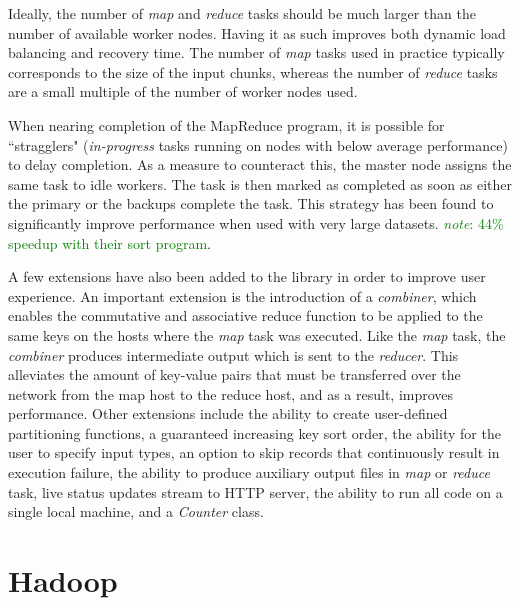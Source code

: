 \documentclass{report}
\newcommand{\note}[1]{\textcolor{green}{\textit{note}: #1}}
\begin{document}
Ideally, the number of \textit{map} and \textit{reduce} tasks should be much larger than the number of available worker nodes. Having it as 
such improves both dynamic load balancing and recovery time. The number of \textit{map} tasks used in practice typically corresponds to the 
size of the input chunks, whereas the number of \textit{reduce} tasks are a small multiple of the number of worker nodes used.

When nearing completion of the MapReduce program, it is possible for  ``stragglers" (\textit{in-progress} tasks running on nodes with below 
average performance) to delay completion. As a measure to counteract this, the master node assigns the same task to idle workers. The 
task is then marked as completed as soon as either the primary or the backups complete the task. This strategy has been found to 
significantly improve performance when used with very large datasets. \note{44\% speedup with their sort program}.

A few extensions have also been added to the library in order to improve user experience. An important extension is the introduction of a 
\textit{combiner}, which enables the commutative and associative reduce function to be applied to the same keys on the hosts where the 
\textit{map} task was executed. Like the \textit{map} task, the \textit{combiner} produces intermediate output which is sent to the 
\textit{reducer}. This alleviates the amount of key-value pairs that must be transferred over the network from the map host to the reduce host, 
and as a result, improves performance. Other extensions include the ability to create user-defined partitioning functions, a guaranteed 
increasing key sort order, the ability for the user to specify input types, an option to skip records that continuously result in execution failure, 
the ability to produce auxiliary output files in \textit{map} or \textit{reduce} task, live status updates stream to HTTP server,  the ability to run 
all code on a single local machine, and a \textit{Counter} class.


















\section{Hadoop}
\cite{hadoop}
\end{document}
